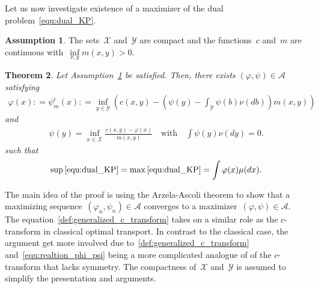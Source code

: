 \documentclass{article}
\newtheorem{theorem}{Theorem}[section]
\theoremstyle{definition}
\newtheorem{assumption}[theorem]{Assumption}
\begin{document}
Let us now investigate existence of a maximizer of the dual problem~\eqref{equ:dual_KP}. 

\begin{assumption}\label{asu:existence_optimal_potentials}
  The sets~$\mathcal{X}$ and~$\mathcal{Y}$ are compact and the functions~$c$ and~$m$ are continuous with~$\inf\limits_{x,y}m(x,y)>0$.   
\end{assumption}

\begin{theorem}\label{pro:solution_dual_KP}
 Let Assumption~\ref{asu:existence_optimal_potentials} be satisfied. Then, there exists $(\varphi, \psi)\in \mathcal{A}$ satisfying 
 \begin{align}\label{def:generalized_c_transform}
     \varphi(x) : =   \psi_m^c (x): = \inf_{y \in \mathcal{Y}} \left(c(x,y) - \left( \psi(y) - \int_{\mathcal{Y}} \psi(b) \nu(db) \right) m(x,y) \right)
 \end{align}
 and
 \begin{align}\label{equ:realtion_phi_psi}
        \psi(y) = \inf_{x\in \mathcal{X}} \frac{c(x,y)- \varphi(x)}{m(x,y)} \quad \mbox{with}  \quad \int \psi(y) \nu(dy) = 0.
 \end{align}
 such that
 \begin{align*}
     \sup \eqref{equ:dual_KP} = \max \eqref{equ:dual_KP} = \int \varphi(x)  \mu(dx).
 \end{align*}
\end{theorem}

The main idea of the proof is using the Arzela-Ascoli theorem to show that a maximizing sequence~$(\varphi_n, \psi_n) \in \mathcal{A}$ converges to a maximizer~$(\varphi , \psi) \in \mathcal{A}$. The equation~\eqref{def:generalized_c_transform} takes on a similar role as the $c$-transform in classical optimal transport. In contrast to the classical case, the argument get more involved due to~\eqref{def:generalized_c_transform} and~\eqref{equ:realtion_phi_psi} being a more complicated analogue of of the $c$-transform that lacks symmetry. The compactness of~$\mathcal{X}$ and~$\mathcal{Y}$ is assumed to simplify the presentation and arguments.
\end{document}
